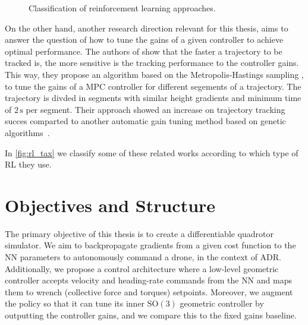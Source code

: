 \begin{figure}[H]
    \centering
    \resizebox{1.0\textwidth}{!}{}
    \caption{Classification of reinforcement learning approaches.}
    \label{fig:rl_tax}
\end{figure}


On the other hand, another research direction relevant for this thesis, aims to answer the question of how to tune the gains of a given controller to achieve optimal performance.
The authors of \cite{loquercio_autotune_2022} show that the faster a trajectory to be tracked is, the more sensitive is the tracking performance to the controller gains.
This way, they propose an algorithm based on the Metropolis-Hastings sampling \cite{metropolis_equation_1953}, to tune the gains of a \ac{MPC} controller for different segements of a trajectory.
The trajectory is divded in segments with similar height gradients and minimum time of $2\, \mathrm{s}$ per segment. 
Their approach showed an increase on trajectory tracking succes comparted to another automatic gain tuning method based on genetic algorithms~\cite{khuwaja_pid_2018}.

In \autoref{fig:rl_tax} we classify some of these related works according to which type of \ac{RL} they use.

\section{Objectives and Structure}

The primary objective of this thesis is to create a differentiable quadrotor simulator.
We aim to backpropagate gradients from a given cost function to the \ac{NN} parameters to autonomously command a drone, in the context of \ac{ADR}.
Additionally, we propose a control architecture where a low-level geometric controller accepts velocity and heading-rate commands from the \ac{NN} and maps them to wrench (collective force and torques) setpoints.
Moreover, we augment the policy so that it can tune its inner $\mathrm{SO}(3)$ geometric controller by outputting the controller gains, and we compare this to the fixed gains baseline.

